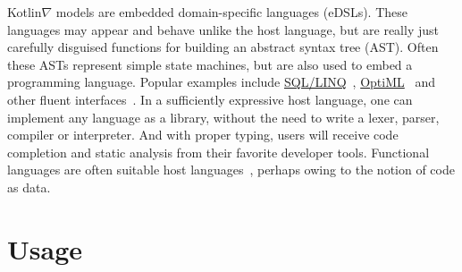 Kotlin$\nabla$ models are embedded domain-specific languages (eDSLs). These languages may appear and behave unlike the host language, but are really just carefully disguised functions for building an abstract syntax tree (AST). Often these ASTs represent simple state machines, but are also used to embed a programming language. Popular examples include \href{https://docs.microsoft.com/en-us/dotnet/framework/data/adonet/sql/linq/}{SQL/LINQ}~\citep{meijer2006linq}, \href{http://stanford-ppl.github.io/Delite/optiml/}{OptiML}~\citep{sujeeth2011optiml} and other fluent interfaces~\citep{fowler05fluent}. In a sufficiently expressive host language, one can implement any language as a library, without the need to write a lexer, parser, compiler or interpreter. And with proper typing, users will receive code completion and static analysis from their favorite developer tools. Functional languages are often suitable host languages~\citep{elliott2003compiling,rompf2010lightweight}, perhaps owing to the notion of code as data.

\section{Usage}

